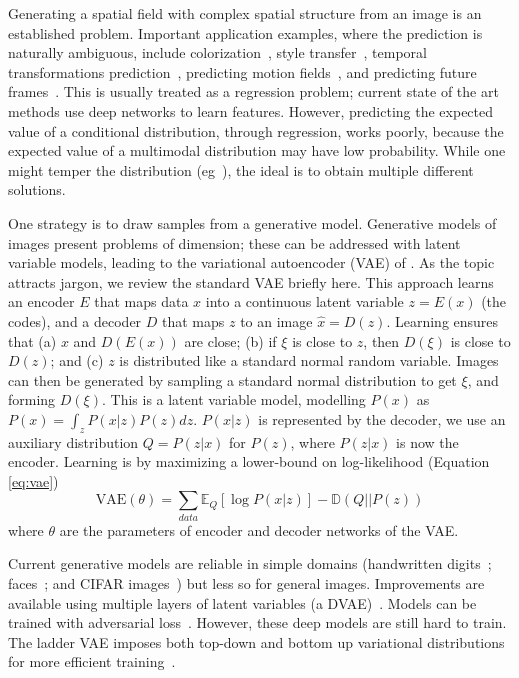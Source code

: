 \documentclass[10pt,twocolumn,letterpaper]{article}
\begin{document}
Generating a spatial field with complex spatial structure from an image is an established problem. Important application
examples, where the prediction is naturally ambiguous, include
colorization~\cite{deshpande2015learning,larsson2016learning, zhang2016colorful}, style transfer~\cite{gatys2015neural},  
temporal transformations prediction~\cite{zhou2016learning}, predicting
motion fields~\cite{sohn2015learning,walker2016uncertain,xue2016visual}, and predicting future
frames~\cite{vondrick2015anticipating}.  
This is usually treated as a regression problem; current state of the art methods use deep networks to learn features. 
However, predicting the expected value of a conditional distribution, through regression, works poorly, because the expected value of a
multimodal distribution may have low probability.   While one might temper the distribution
(eg~\cite{zhang2016colorful}), the ideal is to obtain multiple different solutions.  

One strategy is to draw samples from a generative model.  Generative models of images present problems of dimension;
these can be addressed with latent variable models, leading to the variational autoencoder (VAE) of
\cite{kingma2013auto}.   As the topic attracts jargon, we review the standard VAE briefly here. This approach learns an
encoder $E$ that maps data $x$ into a continuous latent variable $z=E(x)$ (the codes), and a decoder $D$ that maps $z$ to
an image $\hat{x}=D(z)$.  Learning ensures that (a) $x$ and $D(E(x))$ are close; (b) if $\xi$ is close to $z$, then
$D(\xi)$ is close to $D(z)$; and (c) $z$ is distributed like a standard normal random variable.   Images can then be
generated by sampling a standard normal distribution to get $\xi$, and forming $D(\xi)$.  This is a 
latent variable model, modelling $P(x)$ as $P(x) = \int_z P(x|z)P(z)dz$. $P(x|z)$ is represented by the decoder,
we use an auxiliary distribution $Q = P(z|x)$ for $P(z)$, where $P(z|x)$ is now the encoder.  Learning is by maximizing a 
lower-bound on log-likelihood (Equation \ref{eq:vae}) 
\begin{equation}
\mbox{VAE}(\theta) = \sum_{data}\mathbb{E}_Q [\log P(x|z)] - \mathbb{D}(Q || P(z))
\label{eq:vae}
\end{equation}
where $\theta$ are the parameters of encoder and decoder networks of the VAE.


Current generative models are reliable in simple domains (handwritten digits~\cite{kingma2013auto, salimans2015markov};
faces~\cite{kingma2013auto, kulkarni2015deep, rezende2014stochastic}; and CIFAR images~\cite{gregor2015draw}) but less
so for general images.  Improvements are available using multiple layers of latent variables (a
DVAE)~\cite{rezende2014stochastic}. Models can be trained with adversarial loss~\cite{radford2015unsupervised}. However, these deep
models are still hard to train. The ladder VAE imposes both top-down and bottom up  variational distributions for more
efficient training~\cite{sonderby2016ladder}. 
\end{document}
